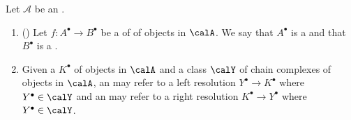 \begin{definition} \label{definition:left_right_resolution_of_a_chain_complex_in_an_abelian_category}
    Let $\mathcal{A}$ be an . 

    \begin{enumerate}
        \item ({\cite[After Theorem B]{spaltenstein_ruc}}) Let $f: A^\bullet \to B^\bullet$ be a  of  of objects in $\calA$. We say that $A^\bullet$ is a  and that $B^\bullet$ is a .

        \item Given a  $K^\bullet$ of objects in $\calA$ and a class $\calY$ of chain complexes of objects in $\calA$, an  may refer to a left resolution $Y^\bullet \to K^\bullet$ where $Y^\bullet \in \calY$ and an  may refer to a right resolution $K^\bullet \to Y^\bullet$ where $Y^\bullet \in \calY$.

    \end{enumerate}

\end{definition}